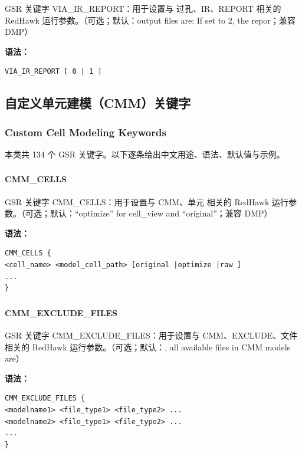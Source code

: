 GSR 关键字 VIA_IR_REPORT：用于设置与 过孔、IR、REPORT 相关的 RedHawk 运行参数。（可选；默认：output files are: If set to 2, the repor；兼容 DMP）

\textbf{语法：}
\begin{lstlisting}
VIA_IR_REPORT [ 0 | 1 ]
\end{lstlisting}

\subsection{自定义单元建模（CMM）关键字}
\subsubsection*{Custom Cell Modeling Keywords}

本类共 134 个 GSR 关键字。以下逐条给出中文用途、语法、默认值与示例。

\subsubsection{}
\paragraph*{CMM_CELLS}

GSR 关键字 CMM_CELLS：用于设置与 CMM、单元 相关的 RedHawk 运行参数。（可选；默认：“optimize” for cell_view and “original”；兼容 DMP）

\textbf{语法：}
\begin{lstlisting}
CMM_CELLS {
<cell_name> <model_cell_path> [original |optimize |raw ]
...
}
\end{lstlisting}

\subsubsection{}
\paragraph*{CMM_EXCLUDE_FILES}

GSR 关键字 CMM_EXCLUDE_FILES：用于设置与 CMM、EXCLUDE、文件 相关的 RedHawk 运行参数。（可选；默认：, all available files in CMM models are）

\textbf{语法：}
\begin{lstlisting}
CMM_EXCLUDE_FILES {
<modelname1> <file_type1> <file_type2> ...
<modelname2> <file_type1> <file_type2> ...
...
}
\end{lstlisting}

